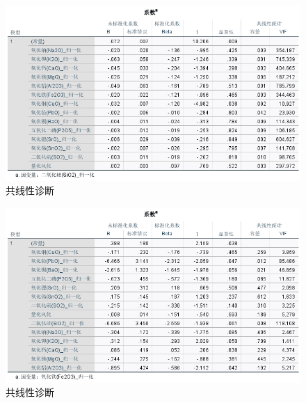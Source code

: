 \documentclass[UTF8]{ctexart}
\begin{document}
\begin{figure}[H]\centering
    \includegraphics[width=1\textwidth,height=0.6\textwidth]{img/1 (24).png} %
    \caption{共线性诊断} %
\end{figure}
\begin{figure}[H]\centering
    \includegraphics[width=1\textwidth,height=0.6\textwidth]{img/1 (25).png} %
    \caption{共线性诊断} %
\end{figure}
\end{document}
